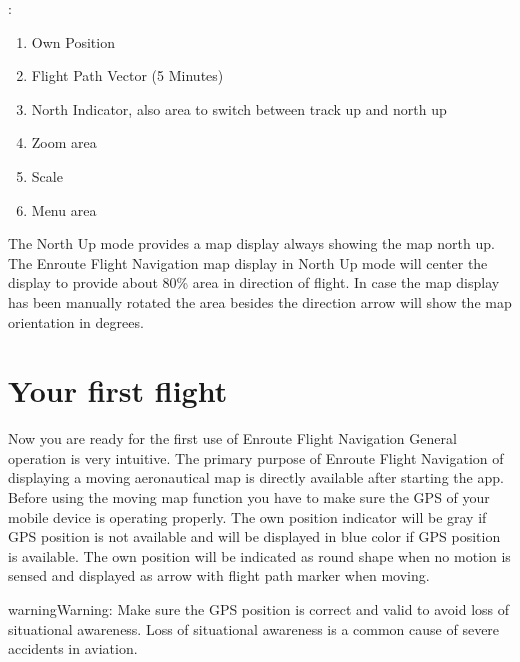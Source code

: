 \documentclass[letterpaper,10pt,english]{sphinxmanual}
\begin{document}
\begin{figure}[htbp]
\centering

\noindent{}
\end{figure}

:
\begin{enumerate}
%
\item {} 
Own Position

\item {} 
Flight Path Vector (5 Minutes)

\item {} 
North Indicator, also area to switch between track up and north up

\item {} 
Zoom area

\item {} 
Scale

\item {} 
Menu area

\end{enumerate}

The North Up mode provides a map display always showing the map north up.
The  Enroute Flight Navigation map display in North Up mode will center the display to provide about 80\% area in direction of flight.
In case the map display has been manually rotated the area besides the direction arrow will show the map orientation in degrees.


\section{Your first flight}
\label{\detokenize{01-intro/getting_started:your-first-flight}}
Now you are ready for the first use of Enroute Flight Navigation General operation is very intuitive. The primary purpose of Enroute Flight Navigation of displaying a moving aeronautical map is directly available after starting the app.
Before using the moving map function you have to make sure the GPS of your mobile device is operating properly. The own position indicator will be gray if GPS position is not available and will be displayed in blue color if GPS position is available. The own position will be indicated as round shape when no motion is sensed and displayed as arrow with flight path marker when moving.

\begin{sphinxadmonition}{warning}{Warning:}
Make sure the GPS position is correct and valid to avoid loss of situational awareness. Loss of situational awareness is a common cause of severe accidents in aviation.
\end{sphinxadmonition}
\end{document}
